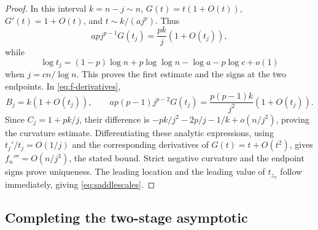 \documentclass[11pt,a4paper]{article}
\numberwithin{equation}{section}
\theoremstyle{definition}
\theoremstyle{remark}
\begin{document}
\begin{proof}
In this interval $k=n-j\sim n$, $G(t)=t(1+O(t))$,
$G'(t)=1+O(t)$, and $t\sim k/(a j^p)$. Thus
\[
 apj^{p-1}G(t_j)=\frac{pk}{j}(1+O(t_j)),
\]
while
\[
 \log t_j=(1-p)\log n+p\log\log n-\log a-p\log c+o(1)
\]
when $j=c n/\log n$. This proves the first estimate and the signs at
the two endpoints. In \eqref{eq:f-derivatives},
\[
 B_j=k(1+O(t_j)),\qquad
 ap(p-1)j^{p-2}G(t_j)=\frac{p(p-1)k}{j^2}(1+O(t_j)).
\]
Since $C_j=1+pk/j$, their difference is
$-pk/j^2-2p/j-1/k+o(n/j^2)$, proving the curvature estimate.
Differentiating these analytic expressions, using
$t_j'/t_j=O(1/j)$ and the corresponding derivatives of
$G(t)=t+O(t^2)$, gives $f_n'''=O(n/j^3)$, the stated bound.
Strict negative curvature and the endpoint signs prove uniqueness.
The leading location and the leading value of $t_{z_n}$ follow immediately,
giving \eqref{eq:saddlescales}.
\end{proof}

\subsection{Completing the two-stage asymptotic}
\end{document}

